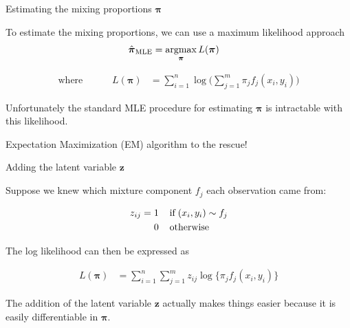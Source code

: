 \documentclass{beamer}
\newcommand{\eqn}[1]{\begin{align*}
#1
\end{align*}}
\newcommand{\vect}[1]{\boldsymbol{\mathbf{#1}}}
\newcommand{\bl}{\big\{}
\newcommand{\br}{\big\}}
\newcommand{\argmax}{\operatornamewithlimits{argmax}}
\newcommand{\vp}{\vect{\pi}}
\newcommand{\vph}{\hat{\vect{\pi}}}
\newcommand{\sumn}{\sum^n_{i=1}}
\newcommand{\summ}{\sum^m_{j=1}}
\newcommand{\fab}{f_j}
\begin{document}
\begin{frame}{Estimating the mixing proportions $\vect{\pi}$}
	
	To estimate the mixing proportions, we can use a maximum likelihood approach
	\eqn{
		\vph_{\text{MLE}} &= \argmax_{\vp} L(\vect{\pi})
	}
	
	
	
	\eqn{
		\mbox{where} \;\;\;\;\;\;\;\;\;\;\; L(\vect{\pi}) &= \sumn \log \Big( \summ \pi_j \fab(x_i,y_i)  \Big)
	}
	
	Unfortunately the standard MLE procedure for estimating $\vp$ is intractable with this likelihood.\newline
	
	Expectation Maximization (EM) algorithm to the rescue!
	
	
	
\end{frame}






\begin{frame}{Adding the latent variable $\vect{z}$}
	
	Suppose we knew which mixture component $f_j$ each observation came from:
	
	\eqn{
		z_{ij} 	= \hspace{1mm} & 1  \hspace{4mm} \text{if} \hspace{1mm} (x_i,y_i) \sim f_j	\\
				& 0 \hspace{4mm} \text{otherwise}
	}
	
	
	The log likelihood can then be expressed as
	
	\eqn{
		L(\vect{\pi}) &= \sumn \summ z_{ij}  \log \bl \pi_j  \fab(x_i,y_i) \br
	}
	
	The addition of the latent variable $\vect{z}$ actually makes things easier because it is easily differentiable in $\vp$.
	
\end{frame}
\end{document}
